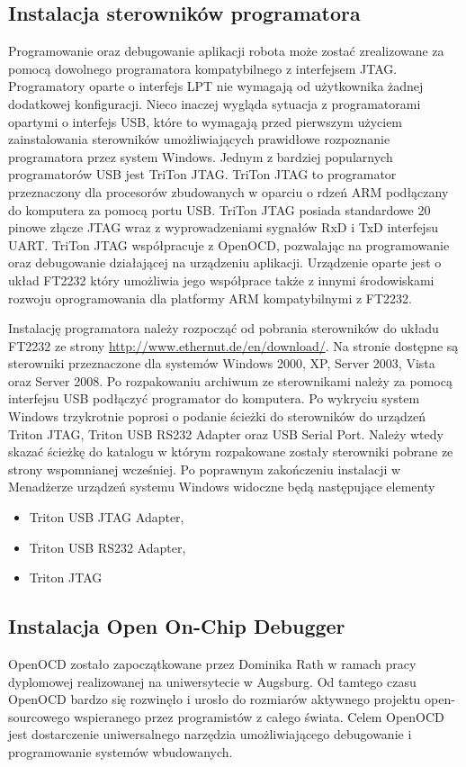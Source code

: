 \subsection{Instalacja sterowników programatora}
Programowanie oraz debugowanie aplikacji robota może zostać zrealizowane za
pomocą dowolnego programatora kompatybilnego z interfejsem JTAG. Programatory
oparte o interfejs LPT nie wymagają od użytkownika żadnej dodatkowej
konfiguracji. Nieco inaczej wygląda sytuacja z programatorami opartymi o
interfejs USB, które to wymagają przed pierwszym użyciem zainstalowania
sterowników umożliwiających prawidłowe rozpoznanie programatora przez system
Windows. Jednym z bardziej popularnych programatorów USB jest TriTon JTAG. TriTon
JTAG to programator przeznaczony dla procesorów zbudowanych w oparciu o rdzeń ARM
podłączany do komputera za pomocą portu USB. TriTon JTAG posiada standardowe 20
pinowe złącze JTAG wraz z wyprowadzeniami sygnałów RxD i TxD interfejsu UART.
TriTon JTAG współpracuje z OpenOCD, pozwalając na programowanie oraz debugowanie
działającej na urządzeniu aplikacji. Urządzenie oparte jest o układ FT2232 który
umożliwia jego współprace także z innymi środowiskami rozwoju oprogramowania dla
platformy ARM kompatybilnymi z FT2232.

Instalację programatora należy rozpocząć od pobrania sterowników do układu FT2232
ze strony \url{http://www.ethernut.de/en/download/}. Na stronie dostępne są
sterowniki przeznaczone dla systemów Windows 2000, XP, Server 2003, Vista oraz
Server 2008. Po rozpakowaniu archiwum ze sterownikami należy za pomocą interfejsu
USB podłączyć programator do komputera. Po wykryciu system Windows trzykrotnie
poprosi o podanie ścieżki do sterowników do urządzeń Triton JTAG, Triton USB
RS232 Adapter oraz USB Serial Port. Należy wtedy skazać ścieżkę do katalogu w
którym rozpakowane zostały sterowniki pobrane ze strony wspomnianej wcześniej. Po
poprawnym zakończeniu instalacji w Menadżerze urządzeń systemu Windows widoczne
będą następujące elementy
\begin{itemize}
  \item Triton USB JTAG Adapter,
  \item Triton USB RS232 Adapter,
  \item Triton JTAG
\end{itemize}

\subsection{Instalacja Open On-Chip Debugger}
OpenOCD zostało zapoczątkowane przez Dominika Rath w ramach pracy dyplomowej
realizowanej na uniwersytecie w Augsburg. Od tamtego czasu OpenOCD bardzo się
rozwinęło i urosło do rozmiarów aktywnego projektu open-sourcowego wspieranego
przez programistów z całego świata. Celem OpenOCD jest dostarczenie
uniwersalnego narzędzia umożliwiającego debugowanie i programowanie systemów
wbudowanych. 

